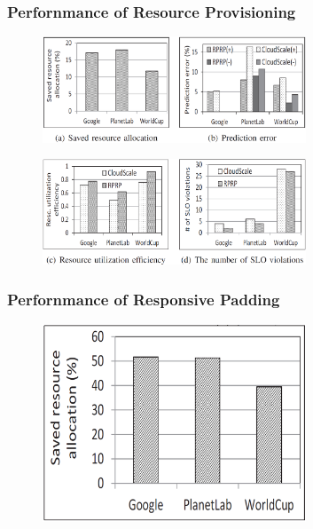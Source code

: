 \documentclass{beamer}
\begin{document}
	\begin{frame}
	\frametitle{Perfornmance of Resource Provisioning}
		\begin{figure}[h!]
		\centering
		\includegraphics[width=0.7\textwidth]{./figure/eva1_4.PNG}
		\end{figure}
		\begin{figure}[h!]
		\centering
		\includegraphics[width=0.7\textwidth]{./figure/eva1_5.PNG}
		\end{figure}
	\end{frame}

	\begin{frame}
	\frametitle{Perfornmance of Responsive Padding}
		\begin{figure}[h!]
		\centering
		\includegraphics[width=0.7\textwidth]{./figure/eva1_6.PNG}
		\end{figure}
	\end{frame}

\end{document}
